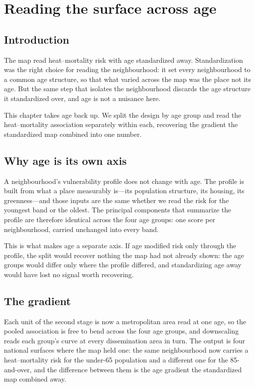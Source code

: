 \chapter{Reading the surface across age}\label{chapter:agefork}

\section{Introduction}

The map read heat--mortality risk with age standardized away. Standardization was the right choice for reading the neighbourhood: it set every neighbourhood to a common age structure, so that what varied across the map was the place not its age. But the same step that isolates the neighbourhood discards the age structure it standardized over, and age is not a nuisance here.

This chapter takes age back up. We split the design by age group and read the heat--mortality association separately within each, recovering the gradient the standardized map combined into one number.

\section{Why age is its own axis}

A neighbourhood's vulnerability profile does not change with age. The profile is built from what a place measurably is---its population structure, its housing, its greenness---and those inputs are the same whether we read the risk for the youngest band or the oldest. The principal components that summarize the profile are therefore identical across the four age groups: one score per neighbourhood, carried unchanged into every band. 

This is what makes age a separate axis. If age modified risk only
through the profile, the split would recover nothing the map had not
already shown: the age groups would differ only where the profile
differed, and standardizing age away would have lost no signal worth
recovering.


\section{The gradient}

Each unit of the second stage is now a metropolitan area read at one age,
so the pooled association is free to bend across the four age groups, and
downscaling reads each group's curve at every dissemination area in turn.
The output is four national surfaces where the map held one: the same
neighbourhood now carries a heat--mortality risk for the under-65 population
and a different one for the 85-and-over, and the difference between them is
the age gradient the standardized map combined away.

